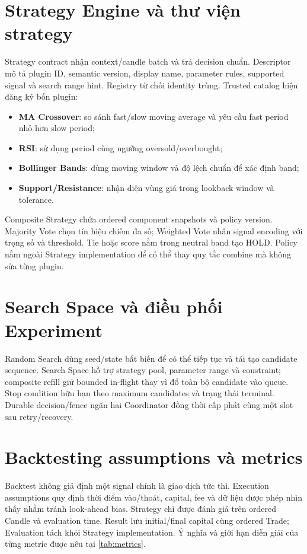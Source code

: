 \documentclass[12pt,a4paper,oneside]{report}
\begin{document}
\section{Strategy Engine và thư viện strategy}

Strategy contract nhận context/candle batch và trả decision chuẩn. Descriptor mô tả plugin ID, semantic version, display name, parameter rules, supported signal và search range hint. Registry từ chối identity trùng. Trusted catalog hiện đăng ký bốn plugin:

\begin{itemize}
  \item \textbf{MA Crossover}: so sánh fast/slow moving average và yêu cầu fast period nhỏ hơn slow period;
  \item \textbf{RSI}: sử dụng period cùng ngưỡng oversold/overbought;
  \item \textbf{Bollinger Bands}: dùng moving window và độ lệch chuẩn để xác định band;
  \item \textbf{Support/Resistance}: nhận diện vùng giá trong lookback window và tolerance.
\end{itemize}

Composite Strategy chứa ordered component snapshots và policy version. Majority Vote chọn tín hiệu chiếm đa số; Weighted Vote nhân signal encoding với trọng số và threshold. Tie hoặc score nằm trong neutral band tạo HOLD. Policy nằm ngoài Strategy implementation để có thể thay quy tắc combine mà không sửa từng plugin.

\section{Search Space và điều phối Experiment}

Random Search dùng seed/state bất biến để có thể tiếp tục và tái tạo candidate sequence. Search Space hỗ trợ strategy pool, parameter range và constraint; composite refill giữ bounded in-flight thay vì đổ toàn bộ candidate vào queue. Stop condition hữu hạn theo maximum candidates và trạng thái terminal. Durable decision/fence ngăn hai Coordinator đồng thời cấp phát cùng một slot sau retry/recovery.

\section{Backtesting assumptions và metrics}

Backtest không giả định một signal chính là giao dịch tức thì. Execution assumptions quy định thời điểm vào/thoát, capital, fee và dữ liệu được phép nhìn thấy nhằm tránh look-ahead bias. Strategy chỉ được đánh giá trên ordered Candle và evaluation time. Result lưu initial/final capital cùng ordered Trade; Evaluation tách khỏi Strategy implementation.
Ý nghĩa và giới hạn diễn giải của từng metric được nêu tại \cref{tab:metrics}.
\end{document}
